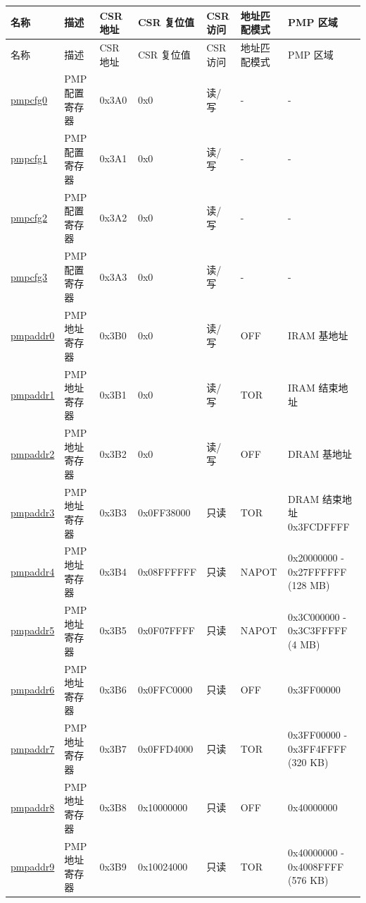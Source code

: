 \begin{longtable}[c]{ | l | l | l | l | l| L{2.2cm}| L{2.23cm}| }
\hline{}
名称 & 描述 & CSR 地址 & CSR 复位值 & CSR 访问 & 地址匹配模式 & PMP 区域\\ \hline
\endfirsthead
\hline
{}
名称 & 描述 & CSR 地址 & CSR 复位值 & CSR 访问 & 地址匹配模式 & PMP 区域\\ \hline
\hline
\endhead
\endfoot

\hyperref[sec:riscvcpu-pmp-reg-desc]{pmpcfg0} & PMP 配置寄存器 & 0x3A0 & 0x0 & 读/写 & - & - \\\hline
\hyperref[sec:riscvcpu-pmp-reg-desc]{pmpcfg1} & PMP 配置寄存器 & 0x3A1 & 0x0 & 读/写 & - & - \\\hline
\hyperref[sec:riscvcpu-pmp-reg-desc]{pmpcfg2} & PMP 配置寄存器 & 0x3A2 & 0x0 & 读/写 & - & - \\\hline
\hyperref[sec:riscvcpu-pmp-reg-desc]{pmpcfg3} & PMP 配置寄存器 & 0x3A3 & 0x0 & 读/写 & - & - \\\hline
\hyperref[sec:riscvcpu-pmp-reg-desc]{pmpaddr0} & PMP 地址寄存器 & 0x3B0 & 0x0 & 读/写 & OFF & IRAM 基地址 \\\hline
\hyperref[sec:riscvcpu-pmp-reg-desc]{pmpaddr1} & PMP 地址寄存器 & 0x3B1 & 0x0 & 读/写 & TOR  & IRAM 结束地址\\\hline
\hyperref[sec:riscvcpu-pmp-reg-desc]{pmpaddr2} & PMP 地址寄存器 & 0x3B2 & 0x0 & 读/写 & OFF & DRAM 基地址 \\\hline
\hyperref[sec:riscvcpu-pmp-reg-desc]{pmpaddr3} & PMP 地址寄存器 & 0x3B3 & 0x0FF38000 & 只读 & TOR & DRAM 结束地址 0x3FCDFFFF \\\hline
\hyperref[sec:riscvcpu-pmp-reg-desc]{pmpaddr4} & PMP 地址寄存器 & 0x3B4 & 0x08FFFFFF & 只读 & NAPOT & 0x20000000 - 0x27FFFFFF (128 MB)\\\hline
\hyperref[sec:riscvcpu-pmp-reg-desc]{pmpaddr5} & PMP 地址寄存器 & 0x3B5 & 0x0F07FFFF & 只读 & NAPOT & 0x3C000000 - 0x3C3FFFFF (4 MB)\\\hline
\hyperref[sec:riscvcpu-pmp-reg-desc]{pmpaddr6} & PMP 地址寄存器 & 0x3B6 & 0x0FFC0000 & 只读 & OFF & 0x3FF00000 \\\hline
\hyperref[sec:riscvcpu-pmp-reg-desc]{pmpaddr7} & PMP 地址寄存器 & 0x3B7 & 0x0FFD4000 & 只读 & TOR & 0x3FF00000 - 0x3FF4FFFF (320 KB)\\\hline
\hyperref[sec:riscvcpu-pmp-reg-desc]{pmpaddr8} & PMP 地址寄存器 & 0x3B8 & 0x10000000 & 只读 & OFF & 0x40000000 \\\hline
\hyperref[sec:riscvcpu-pmp-reg-desc]{pmpaddr9} & PMP 地址寄存器 & 0x3B9 & 0x10024000 & 只读 & TOR & 0x40000000 - 0x4008FFFF (576 KB)\\\hline

\end{longtable}
